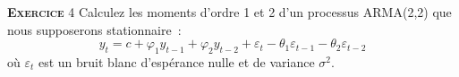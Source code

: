 \documentclass[10pt,a4paper,notitlepage,onecolumn]{article}
\newcommand{\exercice}[1]{\textsc{\textbf{Exercice}} #1}
\begin{document}
\bigskip
\bigskip

\exercice{4} Calculez les moments d'ordre 1 et 2 d'un processus ARMA(2,2) que nous supposerons stationnaire :
\[
y_t = c + \varphi_1 y_{t-1} + \varphi_2 y_{t-2} + \varepsilon_t - \theta_1 \varepsilon_{t-1} - \theta_2 \varepsilon_{t-2}
\]
où $\varepsilon_t$ est un bruit blanc d'espérance nulle et de variance $\sigma^2$.
\end{document}
